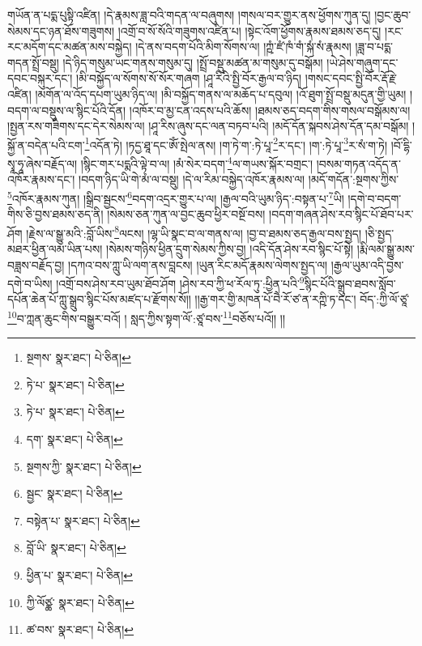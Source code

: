 གཡོན་ན་པདྨ་པུསྟི་འཛིན། །དེ་རྣམས་ཟླ་བའི་གདན་ལ་བཞུགས། །གསལ་བར་གྱུར་ནས་ཕྱོགས་ཀུན་དུ། །བྱང་ཆུབ་སེམས་དང་ཉན་ཐོས་གཟུགས། །འགྲོ་བ་སོ་སོའི་གཟུགས་འཛིན་པ། །སྟེང་འོག་ཕྱོགས་རྣམས་ཐམས་ཅད་དུ། །རང་རང་མདོག་དང་མཚན་མས་བསྐྱེད། །དེ་ནས་བདག་པོའི་མིག་སོགས་ལ། །ཀྵཾ་ཛཾ་ཁཾ་གཾ་སྐཾ་སཾ་རྣམས། །ཟླ་བ་པདྨ་གདན་སྤྲོ་བསྡུ། །དེ་ཉིད་གསུམ་ཡང་གནས་གསུམ་དུ། །སྤྲོ་བསྡུ་མཚན་མ་གསུམ་དུ་བསྒོམ། །ཡེ་ཤེས་གཞུག་དང་དབང་བསྐུར་དང་། །མི་བསྐྱོད་ལ་སོགས་སོ་སོར་གཞག །ཤཱ་རིའི་སྤྱི་བོར་རྒྱལ་བ་ཉིད། །གསང་དབང་སྤྱི་བོར་རྡོ་རྗེ་འཛིན། །མགོན་ལ་འོད་དཔག་ཡུམ་ཉིད་ལ། །མི་བསྐྱོད་གནས་ལ་མཆོད་པ་དབུལ། །འོ་ཐུག་སྤྲོ་བསྡུ་མདུན་གྱི་ཡུམ། །བདག་ལ་བསྡུས་ལ་སྙིང་པོའི་དོན། །འཁོར་བ་མྱ་ངན་འདས་པའི་ཆོས། །ཐམས་ཅད་བདག་གིས་གསལ་བསྒོམས་ལ། །སྤྱན་རས་གཟིགས་དང་དེར་སེམས་ལ། །ཤཱ་རིས་ཞུས་དང་ལན་བཏབ་པའི། །མདོ་དོན་སྐབས་ཤེས་དོན་དམ་བསྒོམ། །སྐྱོ་ན་བདེན་པའི་ངག་\footnote{སྔགས་  སྣར་ཐང་།  པེ་ཅིན། }འདོན་ཏེ། །ཏདྱ་ཐཱ་དང་ཨོཾ་སྤེལ་ནས། །ག་ཏེ་ག་:ཏེ་པཱ་\footnote{ཏེ་པ་  སྣར་ཐང་།  པེ་ཅིན། }ར་དང་། །ག་:ཏེ་པཱ་\footnote{ཏེ་པ་  སྣར་ཐང་།  པེ་ཅིན། }ར་སཾ་ག་ཏེ། །བོ་དྷི་སྭཱ་ཧཱ་ཞེས་བརྗོད་ལ། །སྙིང་གར་པདྨའི་ལྟེ་བ་ལ། །མཾ་སེར་བདག་\footnote{དག་  སྣར་ཐང་།  པེ་ཅིན། }ལ་གཡས་སྐོར་བགྲང་། །བསམ་གཏན་འདོད་ན་འཁོར་རྣམས་དང་། །བདག་ཉིད་ཡི་གེ་མཾ་ལ་བསྡུ། །དེ་ལ་རིམ་བསྐྱེད་འཁོར་རྣམས་ལ། །མདོ་གདོན་:སྔགས་ཀྱིས་\footnote{སྔགས་ཀྱི་  སྣར་ཐང་།  པེ་ཅིན། }འཁོར་རྣམས་ཀུན། །སྒྲིབ་སྦྱངས་\footnote{སྦྱང་  སྣར་ཐང་།  པེ་ཅིན། }བདག་འདྲར་གྱུར་པ་ལ། །རྒྱལ་བའི་ཡུམ་ཉིད་:བསྟན་པ་\footnote{བསྟེན་པ་  སྣར་ཐང་།  པེ་ཅིན། }ཡི། །དགེ་བ་བདག་གིས་ཅི་བྱས་ཐམས་ཅད་ནི། །སེམས་ཅན་ཀུན་ལ་བྱང་ཆུབ་ཕྱིར་བསྔོ་བས། །བདག་གཞན་ཤེས་རབ་སྙིང་པོ་ཐོབ་པར་ཤོག །རྗེས་ལ་སྒྱུ་མའི་:བློ་ཡིས་\footnote{བློ་ཡི་  སྣར་ཐང་།  པེ་ཅིན། }ལངས། །ལྷ་ཡི་སྣང་བ་ལ་གནས་ལ། །བྱ་བ་ཐམས་ཅད་རྒྱལ་བས་སྤྱད། །ཅི་སྤྱད་མཐར་ཕྱིན་ལམ་ཡིན་པས། །སེམས་གཉིས་ཕྱིན་དྲུག་སེམས་ཀྱིས་བྱ། །འདི་དོན་ཤེས་རབ་སྙིང་པོ་སྟེ། །རྨི་ལམ་སྒྱུ་མས་བཟླས་བརྗོད་བྱ། །དཀའ་བས་ཀླུ་ཡི་ལག་ནས་བླངས། །ཡུན་རིང་མདོ་རྣམས་ལེགས་སྤྱད་ལ། །རྒྱལ་ཡུམ་འདི་བྱས་དགེ་བ་ཡིས། །འགྲོ་བས་ཤེས་རབ་ཡུམ་ཐོབ་ཤོག །ཤེས་རབ་ཀྱི་ཕ་རོལ་ཏུ་:ཕྱིན་པའི་\footnote{ཕྱིན་པ་  སྣར་ཐང་།  པེ་ཅིན། }སྙིང་པོའི་སྒྲུབ་ཐབས་སློབ་དཔོན་ཆེན་པོ་ཀླུ་སྒྲུབ་སྙིང་པོས་མཛད་པ་རྫོགས་སོ།། །།རྒྱ་གར་གྱི་མཁན་པོ་བཻ་རོ་ཙ་ན་རཀྵི་ཏ་དང་། བོད་:ཀྱི་ལོ་ཙཱ་\footnote{ཀྱི་ལོཙྪ་  སྣར་ཐང་།  པེ་ཅིན། }བ་ཀླན་ཆུང་གིས་བསྒྱུར་བའོ། །
སླད་ཀྱིས་སྟག་ལོ་:ཙཱ་བས་\footnote{ཚ་བས་  སྣར་ཐང་།  པེ་ཅིན། }བཅོས་པའོ།། །།